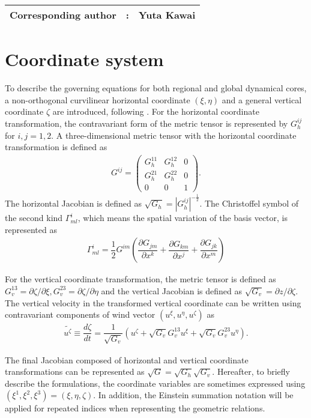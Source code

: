 {\bf \Large
\begin{tabular}{ccc}
\hline
  Corresponding author & : & Yuta Kawai\\
\hline
\end{tabular}
}

\section{Coordinate system}
To describe the governing equations for both regional and global dynamical cores, 
a non-orthogonal curvilinear horizontal coordinate $(\xi,\eta)$ 
and a general vertical coordinate $\zeta$ are introduced, 
following \cite{li2020development}. 
For the horizontal coordinate transformation, 
the contravariant form of the metric tensor is represented by $G_h^{ij}$ for $i, j=1, 2$. 
A three-dimensional metric tensor with the horizontal coordinate transformation is defined as 
\begin{align}
    G^{ij} = \begin{pmatrix}
      G_h^{11} & G_h^{12} & 0 \\
      G_h^{21} & G_h^{22} & 0 \\  
      0 & 0 & 1
    \end{pmatrix}. 
\end{align}
The horizontal Jacobian is defined as $\sqrt{G_h}=|G_{h}^{ij}|^{-\frac{1}{2}}$. 
The Christoffel symbol of the second kind  $\Gamma^i_{ml}$,
which means the spatial variation of the basis vector, is represented as 
\begin{align}
  \Gamma^i_{ml} = \dfrac{1}{2} G^{im} \left( 
    \dfrac{\partial G_{jm}}{\partial x^k} 
  + \dfrac{\partial G_{km}}{\partial x^j} 
  + \dfrac{\partial G_{jk}}{\partial x^m} 
  \right)
\end{align}


For the vertical coordinate transformation, 
the metric tensor is defined as  $G_v^{13}=\partial \zeta/\partial \xi, G_v^{23}=\partial \zeta/\partial \eta $ 
and 
the vertical Jacobian is defined as $\sqrt{G_v}=\partial z/\partial \zeta$.  
The vertical velocity in the transformed vertical coordinate can be written 
using contravariant components of wind vector $(u^\xi, u^\eta, u^\zeta)$ as 
\begin{align}
\widetilde{u^\zeta} \equiv \dfrac{d \zeta}{d t} = \dfrac{1}{\sqrt{G_v}}\left( u^\zeta + \sqrt{G_v} G_v^{13} u^\xi + \sqrt{G_v} G_v^{23} u^\eta \right).  
\end{align}


The final Jacobian composed of horizontal and vertical coordinate transformations can be represented as $\sqrt{G}=\sqrt{G_h}\sqrt{G_v}$. 
Hereafter, to briefly describe the formulations, 
the coordinate variables are sometimes expressed using $(\xi^1,\xi^2,\xi^3)=(\xi,\eta,\zeta)$. 
In addition, 
the Einstein summation notation will be applied 
for repeated indices when representing the geometric relations.


